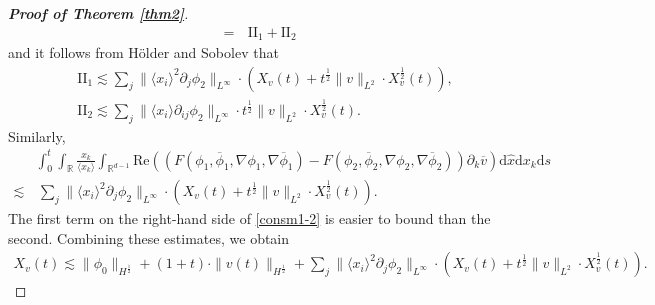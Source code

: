 \documentclass[10pt,twoside,a4paper]{article}
\numberwithin{equation}{section}\allowdisplaybreaks
\begin{document}
\begin{proof}[\textbf{Proof of Theorem \ref{thm2}}]
\begin{align}
 		=&\,\mathrm{II}_1+\mathrm{II}_2\nonumber
 	\end{align}
 	and  it follows from H\"older and Sobolev that
 	\begin{align*}
 		&	\mathrm{II}_1 \lesssim  \sum_j \| \langle x_i \rangle^2  \partial_j \phi_2\|_{L^\infty} \cdot (	X_v(t)+ t^{\frac12} \|v\|_{L^2}\cdot	X_v^{\frac12} (t) ),\\
 		& \mathrm{II}_2 \lesssim \sum_j \| \langle x_i \rangle  \partial_{ij} \phi_2\|_{L^\infty} \cdot t^{\frac12} \|v\|_{L^2}\cdot	X_v^{\frac12}(t) .
 	\end{align*} 
 	Similarly,
 	\begin{align*}
 		&\int_0^t \int_{\mathbb{R}}\frac{x_k}{\langle x_k\rangle} 	\int_{\mathbb{R}^{d-1}} \mathrm{Re} \left( \left(F\left(\phi_1,\overline{\phi}_1,\nabla\phi_1, \nabla \overline{\phi}_1\right)-F\left(\phi_2,\overline{\phi}_2,\nabla\phi_2, \nabla \overline{\phi}_2\right)\right)\partial_k \overline{v} \right)   \mathrm{d} \hat{x}  \mathrm{d} x_k \mathrm{d}s \nonumber\\
 		\lesssim &\,  \sum_j \| \langle x_i \rangle^2  \partial_j \phi_2\|_{L^\infty} \cdot (	X_v(t)+ t^{\frac12} \|v\|_{L^2}\cdot	X_v^{\frac12} (t) ).
 	\end{align*}
 The first term on the right-hand side of \eqref{consm1-2} is easier to bound than the second. 
 Combining these estimates, we obtain
 	\begin{align} \label{qunimon1}
 		X_v(t) \lesssim \|\phi_0\|_{H^{\frac12}}+(1+t) \cdot\|v(t)\|_{H^{\frac12}}+ \sum_j \| \langle x_i \rangle^2  \partial_j \phi_2\|_{L^\infty} \cdot (	X_v(t)+ t^{\frac12} \|v\|_{L^2}\cdot	X_v^{\frac12} (t) ).
 	\end{align}
 
 	
 	

\end{proof}
\end{document}

